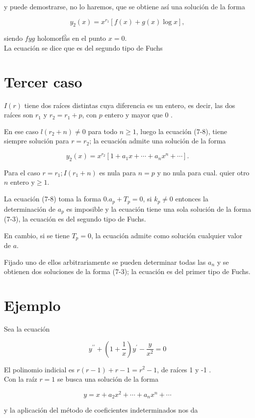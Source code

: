 \documentclass[10pt]{article}
\theoremstyle{plain}
\theoremstyle{definition}
\theoremstyle{remark}
\begin{document}
y puede demostrarse, no lo haremos, que se obtiene así una solución de la forma

$$
y_{2}(x)=x^{r_{1}}[f(x)+g(x) \log x],
$$


siendo $f y g$ holomorfằs en el punto $x=0$.\\
La ecuación se dice que es del segundo tipo de Fuchs

\section*{Tercer caso}
$I(r)$ tiene dos raíces distintas cuya diferencia es un entero, es decir, las dos raíces son $r_{1}$ y $r_{2}=r_{1}+p$, con $p$ entero y mayor que 0 .

En ese caso $l\left(r_{2}+n\right) \neq 0$ para todo $n \geqslant 1$, luego la ecuación (7-8), tiene siempre solución para $r=r_{2}$; la ecuación admite una solución de la forma

$$
y_{2}(x)=x^{r_{2}}\left[1+a_{1} x+\cdots+a_{n} x^{n}+\cdots\right] .
$$

Para el caso $r=r_{1} ; I\left(r_{1}+n\right)$ es nula para $n=p$ y no nula para cual. quier otro $n$ entero $\mathrm{y} \geqslant 1$.

La ecuación (7-8) toma la forma $0 . a_{p}+T_{p}=0$, si $k_{p} \neq 0$ entonces la determinación de $a_{p}$ es imposible y la ecuación tiene una sola solución de la forma (7-3), la ecuación es del segundo tipo de Fuchs.

En cambio, si se tiene $T_{p}=0$, la ecuación admite como solución cualquier valor de $a$.

Fijado uno de ellos arbitrariamente se pueden determinar todas las $a_{n}$ y se obtienen dos soluciones de la forma (7-3); la ecuación es del primer tipo de Fuchs.

\section*{Ejemplo}
Sea la ecuación

$$
y^{\prime \prime}+\left(1+\frac{1}{x}\right) y^{\prime}-\frac{y}{x^{2}}=0
$$

El polinomio indicial es $r(r-1)+r-1=r^{2}-1$, de raíces 1 y -1 .\\
Con la raíz $r=1$ se busca una solución de la forma

$$
y=x+a_{2} x^{2}+\cdots+a_{n} x^{n}+\cdots
$$

y la aplicación del método de coeficientes indeterminados nos da
\end{document}
